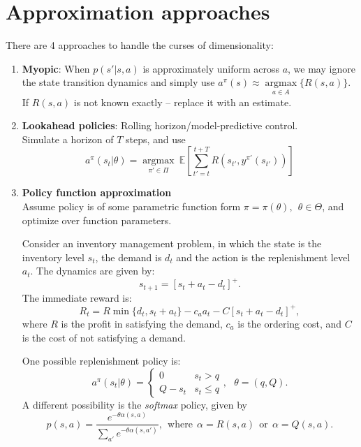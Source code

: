 \section{Approximation approaches}
There are 4 approaches to handle the curses of dimensionality:
\begin{enumerate}\negspace
\item \textbf{Myopic}: When $p(s'|s,a)$ is approximately uniform across $a$, we may ignore the state transition dynamics and simply use $a^\pi(s)\approx \underset{a \in A}{\operatorname{argmax}} \{R(s,a)\}$. If $R(s,a)$ is not known exactly -- replace it with an estimate.

\item \textbf{Lookahead policies}: Rolling horizon/model-predictive control.\\
Simulate a horizon of $T$ steps, and use
$$a^\pi(s_t|\theta) = \underset{\pi' \in \Pi}{\operatorname{argmax}}\  \mathbb{E} \left[\sum_{t'=t}^{t+T} R(s_{t'},y^{\pi'}(s_{t'}))\right]$$

\item \textbf{Policy function approximation}\\
Assume policy is of some parametric function form $\pi = \pi(\theta), \ \ \theta \in \Theta$, and optimize over function parameters.\\
\begin{example}
Consider an inventory management problem, in which the state is the inventory level $s_t$, the demand is $d_t$ and the action is the replenishment level $a_t$. The dynamics are given by:
$$s_{t+1} = [s_t + a_t-d_t]^+.$$
The immediate reward is:
$$R_t = R \min\{d_t,s_t+a_t\} - c_a a_t -C[s_t + a_t-d_t]^+,$$
where $R$ is the profit in satisfying the demand, $c_a$ is the ordering cost, and $C$ is the cost of not satisfying a demand.

One possible replenishment policy is:
$$a^\pi(s_t|\theta) = \begin{cases} 0 & s_t > q\\Q-s_t & s_t \le q \end{cases}, \ \ \ \theta=(q,Q).$$
A different possibility is the \emph{softmax} policy, given by
$$p(s,a) = \frac{e^{-\theta\alpha(s,a)}}{\sum_{a'} e^{-\theta\alpha(s,a')}}, \ \ \mathrm{where}\ \ \alpha=R(s,a)\ \ \mathrm{or} \ \ \alpha=Q(s,a).$$
\end{example}


\end{enumerate}
